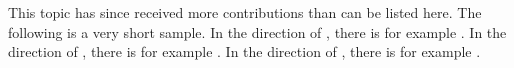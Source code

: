 

This topic has since received more contributions than can be listed here.
The following is a very short sample.
In the direction of \citet{zafar2017fairnessconstraints}, there is for example \citet{quadrianto2017recycling,ustun2019fairness,lohaus2020too}.
In the direction of \citet{kamiran2012data}, there is for example \citet{AgaBeyDudLanetal18,roh2021fairbatch}.
In the direction of \citet{hardt2016equality}, there is for example \citet{hebert2018multicalibration}.

